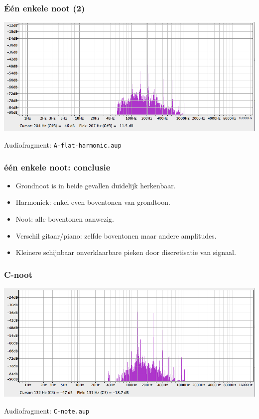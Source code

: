 \documentclass[compress, darktitle, framenumber]{beamer}
\begin{document}
\begin{frame}
\frametitle{\'E\'en enkele noot (2)}
\includegraphics[width=\textwidth]{images/A-flat-harmonic.png}
\begin{block}{Audiofragment:}
\texttt{A-flat-harmonic.aup} 
\end{block}
\end{frame}

\begin{frame}
\frametitle{\'e\'en enkele noot: conclusie}
\begin{itemize}
\item Grondnoot is in beide gevallen duidelijk herkenbaar.
\item Harmoniek: enkel even boventonen van grondtoon.  
\item Noot: alle boventonen aanwezig. 
\item Verschil gitaar/piano: zelfde boventonen maar andere amplitudes. 
\item Kleinere schijnbaar onverklaarbare pieken door discretisatie van signaal. 
\end{itemize}
\end{frame}


\begin{frame}
\frametitle{C-noot}
\includegraphics[width=\textwidth]{images/C-note.png}
\begin{block}{Audiofragment:}
\texttt{C-note.aup} 
\end{block}
\end{frame}
\end{document}
